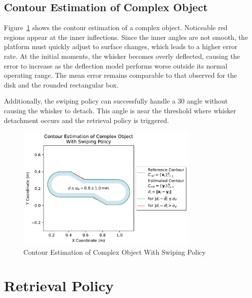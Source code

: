 \subsection{Contour Estimation of Complex Object}

Figure~\ref{fig:experiment-complex-object-swiping} shows the contour estimation of a complex object.
Noticeable red regions appear at the inner inflections.
Since the inner angles are not smooth, the platform must quickly adjust to surface changes, which leads to a higher error rate.
At the initial moments, the whisker becomes overly deflected, causing the error to increase as the deflection model performs worse outside its normal operating range.
The mean error remains comparable to that observed for the disk and the rounded rectangular box.

Additionally, the swiping policy can successfully handle a 30\degree{} angle without causing the whisker to detach.
This angle is near the threshold where whisker detachment occurs and the retrieval policy is triggered.

\begin{figure}[!htb]
    \centering
    \includegraphics[width=0.8\textwidth]{figures/experiments/complex-object-swiping}
    \caption{Contour Estimation of Complex Object With Swiping Policy}
    \label{fig:experiment-complex-object-swiping}
\end{figure}


\section{Retrieval Policy}

